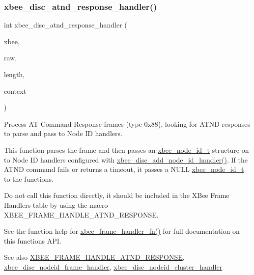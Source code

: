 \subsubsection{\texorpdfstring{xbee\+\_\+disc\+\_\+atnd\+\_\+response\+\_\+handler()}{xbee\_disc\_atnd\_response\_handler()}}
{\footnotesize\ttfamily int xbee\+\_\+disc\+\_\+atnd\+\_\+response\+\_\+handler (\begin{DoxyParamCaption}\item[{\hyperlink{structxbee__dev__t}{xbee\+\_\+dev\+\_\+t} $\ast$}]{xbee,  }\item[{const void \hyperlink{group__hal_gaef060b3456fdcc093a7210a762d5f2ed}{F\+AR} $\ast$}]{raw,  }\item[{\hyperlink{group__hal__dos_ga5a8b2dc9e45a9ee81a94ef304fb62505}{uint16\+\_\+t}}]{length,  }\item[{void \hyperlink{group__hal_gaef060b3456fdcc093a7210a762d5f2ed}{F\+AR} $\ast$}]{context }\end{DoxyParamCaption})}



Process AT Command Response frames (type 0x88), looking for A\+T\+ND responses to parse and pass to Node ID handlers. 

This function parses the frame and then passes an \hyperlink{structxbee__node__id__t}{xbee\+\_\+node\+\_\+id\+\_\+t} structure on to Node ID handlers configured with \hyperlink{group__xbee__discovery_ga59a0294fbcb1b9f43b8436d4ec3a5a9e}{xbee\+\_\+disc\+\_\+add\+\_\+node\+\_\+id\+\_\+handler()}. If the A\+T\+ND command fails or returns a timeout, it passes a N\+U\+LL \hyperlink{structxbee__node__id__t}{xbee\+\_\+node\+\_\+id\+\_\+t} to the functions.

Do not call this function directly, it should be included in the X\+Bee Frame Handlers table by using the macro X\+B\+E\+E\+\_\+\+F\+R\+A\+M\+E\+\_\+\+H\+A\+N\+D\+L\+E\+\_\+\+A\+T\+N\+D\+\_\+\+R\+E\+S\+P\+O\+N\+SE.

See the function help for \hyperlink{group__xbee__device_ga3e6f2b540e8cec7a69ef0b0166da14ff}{xbee\+\_\+frame\+\_\+handler\+\_\+fn()} for full documentation on this function\textquotesingle{}s A\+PI.

\begin{DoxySeeAlso}{See also}
\hyperlink{group__xbee__discovery_gadfed4daf7748e615dedf036d94d9fee9}{X\+B\+E\+E\+\_\+\+F\+R\+A\+M\+E\+\_\+\+H\+A\+N\+D\+L\+E\+\_\+\+A\+T\+N\+D\+\_\+\+R\+E\+S\+P\+O\+N\+SE}, \hyperlink{group__xbee__discovery_gac15854e05ef3f80d6ddae653065c0a40}{xbee\+\_\+disc\+\_\+nodeid\+\_\+frame\+\_\+handler}, \hyperlink{group__xbee__discovery_ga20bc82e8efc243e295c99c23948bed3b}{xbee\+\_\+disc\+\_\+nodeid\+\_\+cluster\+\_\+handler} 
\end{DoxySeeAlso}
\mbox{\label{group__xbee__discovery_ga8eb851e497917304412328f434af7c95}} 
